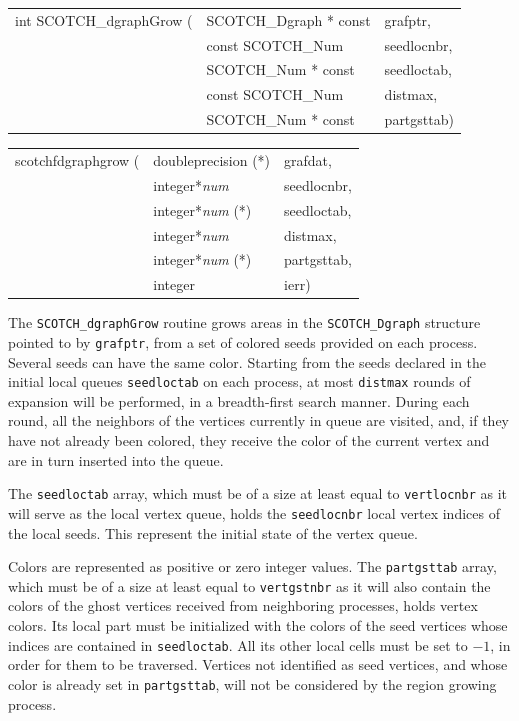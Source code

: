 \begin{itemize}
\progsyn

{\tt\begin{tabular}{l@{}ll}
int SCOTCH\_dgraphGrow ( & SCOTCH\_Dgraph * const & grafptr,    \\
                         & const SCOTCH\_Num      & seedlocnbr, \\
                         & SCOTCH\_Num * const    & seedloctab, \\
                         & const SCOTCH\_Num      & distmax,    \\
                         & SCOTCH\_Num * const    & partgsttab) \\
\end{tabular}}

{\tt\begin{tabular}{l@{}ll}
scotchfdgraphgrow ( & doubleprecision (*)   & grafdat,    \\
                    & integer*{\it num}     & seedlocnbr, \\
                    & integer*{\it num} (*) & seedloctab, \\
                    & integer*{\it num}     & distmax,    \\
                    & integer*{\it num} (*) & partgsttab, \\
                    & integer               & ierr)
\end{tabular}}

\progdes

The \texttt{SCOTCH\_dgraphGrow} routine grows areas in the
\texttt{SCOTCH\_\lbt Dgraph} structure pointed to by \texttt{grafptr},
from a set of colored seeds provided on each process. Several seeds
can have the same color. Starting from the seeds declared in the
initial local queues \texttt{seedloctab} on each process, at most
\texttt{distmax} rounds of expansion will be performed, in a
breadth-first search manner. During each round, all the neighbors of
the vertices currently in queue are visited, and, if they have not
already been colored, they receive the color of the current vertex and
are in turn inserted into the queue.

The \texttt{seedloctab} array, which must be of a size at least equal
to \texttt{vertlocnbr} as it will serve as the local vertex queue,
holds the \texttt{seedlocnbr} local vertex indices of the local
seeds. This represent the initial state of the vertex queue.

Colors are represented as positive or zero integer values. The
\texttt{partgsttab} array, which must be of a size at least equal to
\texttt{vertgstnbr} as it will also contain the colors of the ghost
vertices received from neighboring processes, holds vertex colors.
Its local part must be initialized with the colors of the seed
vertices whose indices are contained in \texttt{seedloctab}. All its
other local cells must be set to $-1$, in order for them to be
traversed. Vertices not identified as seed vertices, and whose color
is already set in \texttt{partgsttab}, will not be considered by the
region growing process.


\end{itemize}
